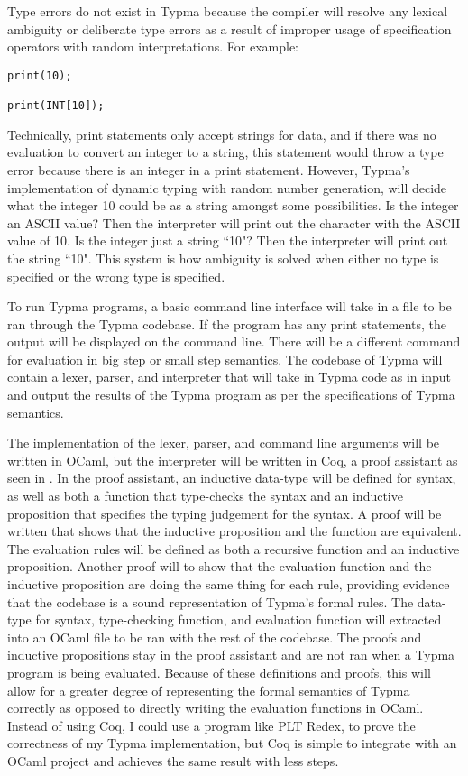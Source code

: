 \documentclass[10pt,twocolumn]{article}
\begin{document}
Type errors do not exist in Typma because the compiler will resolve any lexical ambiguity or deliberate type errors as a result of improper usage of specification operators with random interpretations. For example:

\begin{lstlisting}
print(10);

print(INT[10]);
\end{lstlisting}

Technically, print statements only accept strings for data, and if there was no evaluation to convert an integer to a string, this statement would throw a type error because there is an integer in a print statement. However, Typma's implementation of dynamic typing with random number generation, will decide what the integer 10 could be as a string amongst some possibilities. Is the integer an ASCII value? Then the interpreter will print out the character with the ASCII value of 10. Is the integer just a string ``10"? Then the interpreter will print out the string ``10". This system is how ambiguity is solved when either no type is specified or the wrong type is specified.

To run Typma programs, a basic command line interface will take in a file to be ran through the Typma codebase. If the program has any print statements, the output will be displayed on the command line. There will be a different command for evaluation in big step or small step semantics. The codebase of Typma will contain a lexer, parser, and interpreter that will take in Typma code as in input and output the results of the Typma program as per the specifications of Typma semantics.

The implementation of the lexer, parser, and command line arguments will be written in OCaml, but the interpreter will be written in Coq, a proof assistant as seen in \textcite{Pierce2021Software}. In the proof assistant, an inductive data-type will be defined for syntax, as well as both a function that type-checks the syntax and an inductive proposition that specifies the typing judgement for the syntax. A proof will be written that shows that the inductive proposition and the function are equivalent. The evaluation rules will be defined as both a recursive function and an inductive proposition. Another proof will to show that the evaluation function and the inductive proposition are doing the same thing for each rule, providing evidence that the codebase is a sound representation of Typma's formal rules. The data-type for syntax, type-checking function, and evaluation function will extracted into an OCaml file to be ran with the rest of the codebase. The proofs and inductive propositions stay in the proof assistant and are not ran when a Typma program is being evaluated. Because of these definitions and proofs, this will allow for a greater degree of representing the formal semantics of Typma correctly as opposed to directly writing the evaluation functions in OCaml. Instead of using Coq, I could use a program like PLT Redex, to prove the correctness of my Typma implementation, but Coq is simple to integrate with an OCaml project and achieves the same result with less steps.
\end{document}
